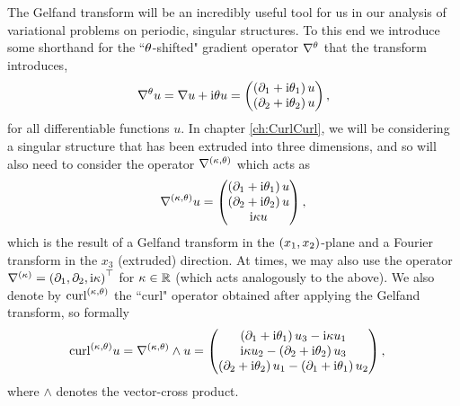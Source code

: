 The Gelfand transform will be an incredibly useful tool for us in our analysis of variational problems on periodic, singular structures.
To this end we introduce some shorthand for the ``$\theta$-shifted" gradient operator $\nabla^{\theta}$ that the transform introduces,
\begin{align*}
	\nabla^{\theta} u = \nabla u + \mathrm{i}\theta u 
	= \begin{pmatrix} \left( \partial_1 + \mathrm{i}\theta_1 \right)u \\ \left( \partial_2 + \mathrm{i}\theta_2 \right)u \end{pmatrix},
\end{align*}
for all differentiable functions $u$.
In chapter \ref{ch:CurlCurl}, we will be considering a singular structure that has been extruded into three dimensions, and so will also need to consider the operator $\nabla^{\left( \kappa, \theta \right)}$ which acts as
\begin{align*}
	\nabla^{\left( \kappa, \theta \right)} u = 
	\begin{pmatrix} \left( \partial_1 + \mathrm{i}\theta_1 \right)u \\ \left( \partial_2 + \mathrm{i}\theta_2 \right)u \\ \mathrm{i}\kappa u \end{pmatrix},
\end{align*}
which is the result of a Gelfand transform in the $\left( x_1,x_2 \right)$-plane and a Fourier transform in the $x_3$ (extruded) direction.
At times, we may also use the operator $\nabla^{(\kappa)} = \left( \partial_1, \partial_2, \mathrm{i}\kappa \right)^\top$ for $\kappa\in\mathbb{R}$ (which acts analogously to the above).
We also denote by $\mathrm{curl}_{}^{\left( \kappa, \theta \right)}$ the ``curl" operator obtained after applying the Gelfand transform, so formally
\begin{align*}
	\mathrm{curl}_{}^{\left( \kappa, \theta \right)} u &= \nabla^{\left( \kappa, \theta \right)}\wedge u
	= 
	\begin{pmatrix}
		\left( \partial_1+\mathrm{i}\theta_1 \right) u_3 - \mathrm{i}\kappa u_1 \\
		\mathrm{i}\kappa u_2 - \left( \partial_2+\mathrm{i}\theta_2 \right) u_3 \\
		\left( \partial_2+\mathrm{i}\theta_2 \right) u_1 - \left( \partial_1+\mathrm{i}\theta_1 \right) u_2
	\end{pmatrix},
\end{align*}
where $\wedge$ denotes the vector-cross product.

